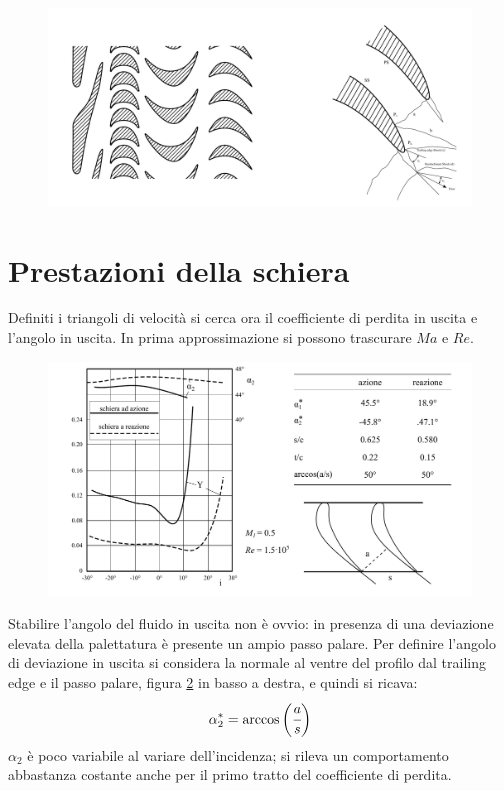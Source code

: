 \begin{figure}
\centering
  \includegraphics[width=\textwidth]{fig/PaleSup.pdf}
\caption{}
\label{fig:PaleSup}
\end{figure}

\section{Prestazioni della schiera}
Definiti i triangoli di velocità si cerca ora il coefficiente di perdita in uscita e l'angolo in uscita. In prima approssimazione si possono trascurare $Ma$ e $Re$.
\begin{figure}[h!]
\centering
  \includegraphics[width=\textwidth]{fig/PrestSchieraTurb.pdf}
\caption{}
\label{fig:PrestSchieraTurb}
\end{figure}

Stabilire l'angolo del fluido in uscita non è ovvio: in presenza di una deviazione elevata della palettatura è presente un ampio passo palare. Per definire l'angolo di deviazione in uscita si considera la normale al ventre del profilo dal trailing edge e il passo palare, figura \ref{fig:PrestSchieraTurb} in basso a destra, e quindi si ricava:
\begin{align*}
\alpha_2^* = \arccos \bigg(\cfrac{a}{s}\bigg)
\end{align*}
$\alpha_2$ è poco variabile al variare dell'incidenza; si rileva un comportamento abbastanza costante anche per il primo tratto del coefficiente di perdita.


